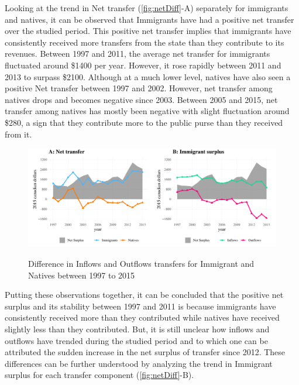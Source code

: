 \vspace{0.7em}\par
Looking at the trend in Net transfer (\autoref{fig:netDiff}-A) separately for immigrants and natives, it can be observed that Immigrants have had a positive net transfer over the studied period.
This positive net transfer implies that immigrants have consistently received more transfers from the state than they contribute to its revenues.
Between 1997 and 2011, the average net transfer for immigrants fluctuated around \$1400 per year.
However, it rose rapidly between 2011 and 2013 to surpass \$2100.
Although at a much lower level, natives have also seen a positive Net transfer between 1997 and 2002.
However, net transfer among natives drops and becomes negative since 2003.
Between 2005 and 2015, net transfer among natives has mostly been negative with slight fluctuation around \$280, a sign that they contribute more to the public purse than they received from it.

  \begin{figure}[H]%
    \caption{Difference in Inflows and Outflows transfers for Immigrant and Natives between 1997 to 2015}
    \includegraphics[width=1\textwidth]{res/netDiff.pdf}%
    \label{fig:netDiff}%
\end{figure}%

\vspace{0.7em}\par
Putting these observations together, it can be concluded that the positive net surplus and its stability between 1997 and 2011 is because immigrants have consistently received more than they contributed while natives have received slightly less than they contributed.
But, it is still unclear how inflows and outflows have trended during the studied period and to which one can be attributed the sudden increase in the net surplus of transfer since 2012.
These differences can be further understood by analyzing the trend in Immigrant surplus for each transfer component (\autoref{fig:netDiff}-B).

